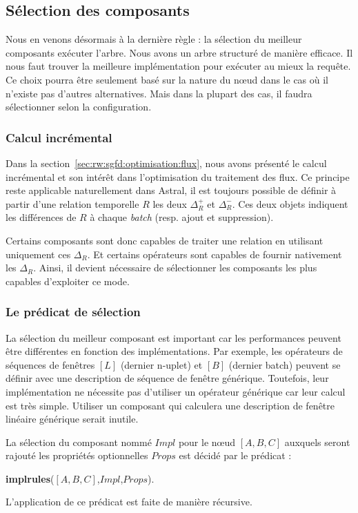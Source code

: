 \subsection{Sélection des composants}
Nous en venons désormais à la dernière règle : la sélection du meilleur composants exécuter l'arbre. Nous avons un arbre structuré de manière efficace. Il nous faut trouver la meilleure implémentation pour exécuter au mieux la requête. Ce choix pourra être seulement basé sur la nature du nœud dans le cas où il n'existe pas d'autres alternatives. Mais dans la plupart des cas, il faudra sélectionner selon la configuration.

\subsubsection{Calcul incrémental}
Dans la section~\ref{sec:rw:sgfd:optimisation:flux}, nous avons présenté le calcul incrémental et son intérêt dans l'optimisation du traitement des flux. Ce principe reste applicable naturellement dans Astral, il est toujours possible de définir à partir d'une relation temporelle $R$ les deux $\Delta_R^+$ et $\Delta_R^-$. Ces deux objets indiquent les différences de $R$ à chaque \textit{batch} (resp. ajout et suppression). 

Certains composants sont donc capables de traiter une relation en utilisant uniquement ces $\Delta_R$. Et certains opérateurs sont capables de fournir nativement les $\Delta_R$. Ainsi, il devient nécessaire de sélectionner les composants les plus capables d'exploiter ce mode.

\subsubsection{Le prédicat de sélection}
La sélection du meilleur composant est important car les performances peuvent être différentes en fonction des implémentations. Par exemple, les opérateurs de séquences de fenêtres $[L]$ (dernier n-uplet) et $[B]$ (dernier batch) peuvent se définir avec une description de séquence de fenêtre générique. Toutefois, leur implémentation ne nécessite pas d'utiliser un opérateur générique car leur calcul est très simple. Utiliser un composant qui calculera une description de fenêtre linéaire générique serait inutile.

\begin{regle}
La sélection du composant nommé $Impl$ pour le nœud $[A,B,C]$ auxquels seront rajouté les propriétés optionnelles $Props$ est décidé par le prédicat :
\begin{center} \textbf{implrules}($[A,B,C]$,$Impl$,$Props$).\end{center}
L'application de ce prédicat est faite de manière récursive.
\end{regle}

